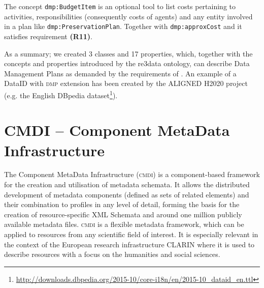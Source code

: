 \documentclass[runningheads,a4paper]{llncs}
\newcommand{\cmdi}{{\scshape cmdi}\xspace}
\newcommand{\dmp}{{\scshape dmp}\xspace}
\newcommand{\prop}[1]{{{\texttt{#1}}}}
\newcommand\footnoteurl[1]{\footnote{\scriptsize\url{#1}}}
\begin{document}
The concept \prop{dmp:BudgetItem} is an optional tool to list costs pertaining to activities, responsibilities (consequently costs of agents) and any entity involved in a plan like \prop{dmp:PreservationPlan}. Together with \prop{dmp:approxCost} and\hfill \break \prop{dmp:justification} it satisfies requirement \textbf{(R11)}.

As a summary; we created 3 classes and 17 properties, which, together with the concepts and properties introduced by the re3data ontology, can describe Data Management Plans as demanded by the requirements of .
An example of a DataID with \dmp extension has been created by the ALIGNED H2020 project (e.g. the English DBpedia dataset\footnoteurl{http://downloads.dbpedia.org/2015-10/core-i18n/en/2015-10_dataid_en.ttl}).

\section{CMDI -- Component MetaData Infrastructure}
\label{cmdi}
The Component MetaData Infrastructure (\cmdi) is a component-based framework for the creation and utilisation of metadata schemata\cite{BROEDER10.163}. It allows the distributed development of metadata components (defined as sets of related elements) and their combination to profiles in any level of detail, forming the basis for the creation of resource-specific XML Schemata and around one million publicly available metadata files. \cmdi is a flexible metadata framework, which can be applied to resources from any scientific field of interest. It is especially relevant in the context of the European research infrastructure CLARIN\cite{Hinrichs2014} where it is used to describe resources with a focus on the humanities and social sciences.
\end{document}
